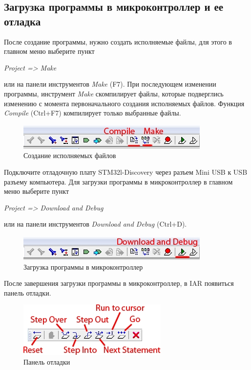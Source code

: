\subsection{Загрузка программы в микроконтроллер и ее отладка}
После создание программы, нужно создать исполняемые файлы, для этого в главном меню выберите пункт 
\begin{center}
\textit{Project => Make}
\end{center}
или на панели инструментов\textit{ Make} (F7). При последующем изменении программы, инструмент \textit{Make} скомпилирует файлы, которые подверглись изменению с момента первоначального создания исполняемых файлов. Функция \textit{Compile} (Ctrl+F7) компилирует только выбранные файлы. 

\begin{figure}[h!]
\begin{center}
\includegraphics[scale=0.7]{Image/20.jpg}
\end{center}
\caption{Создание исполняемых файлов}
\end{figure}

Подключите отладочную плату STM32l-Discovery через разъем Mini USB к USB разъему компьютера. Для загрузки программы в микроконтроллер в главном меню выберите пункт 
\begin{center}
\textit{Project => Download and Debug}
\end{center}
или на панели инструментов \textit{Download and Debug} (Ctrl+D). 

 
\begin{figure}[h!]
\begin{center}
\includegraphics[scale=0.7]{Image/21.jpg}
\end{center}
\caption{Загрузка программы в микроконтроллер}
\end{figure}

После завершения загрузки программы в микроконтроллер, в IAR появиться панель отладки. 
\begin{figure}[h!]
\begin{center}
\includegraphics[scale=0.7]{Image/22.jpg}
\end{center}
\caption{Панель отладки}
\end{figure}

